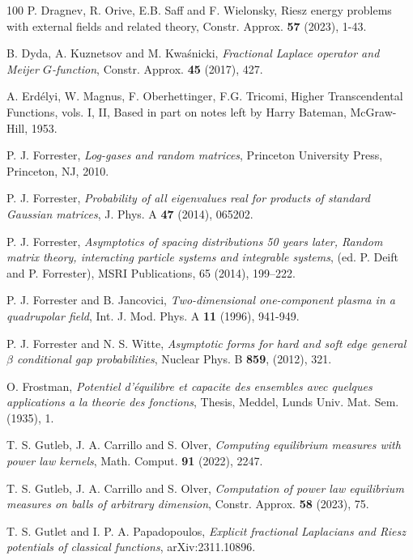\documentclass[10pt]{amsart}
\theoremstyle{plain}
\theoremstyle{remark}
\numberwithin{equation}{section}
\begin{document}
\begin{thebibliography}{100}
P. Dragnev, R. Orive, E.B. Saff and F. Wielonsky, Riesz energy problems with external fields and related theory, Constr. Approx. \textbf{57} (2023), 1-43.



 B. Dyda, A. Kuznetsov and M. Kwa\'{s}nicki, \emph{Fractional Laplace operator and Meijer $G$-function}, Constr. Approx. \textbf{45} (2017), 427. %




 A. Erdélyi, W. Magnus, F. Oberhettinger, F.G. Tricomi, Higher Transcendental Functions, vols. I, II, Based in part on notes left by Harry Bateman, McGraw-Hill, 1953. 
 

 P. J. Forrester, \emph{Log-gases and random matrices}, Princeton University Press, Princeton, NJ, 2010.

 P. J. Forrester, \emph{Probability of all eigenvalues real for products of standard Gaussian matrices}, J. Phys. A \textbf{47} (2014), 065202. 

 P. J. Forrester, \emph{Asymptotics of spacing distributions 50 years later, Random matrix theory, interacting particle systems and integrable systems}, (ed. P. Deift and P. Forrester), MSRI Publications, 65
(2014), 199–222.

 P. J. Forrester and B. Jancovici, \emph{Two-dimensional one-component plasma in a quadrupolar field}, Int. J. Mod. Phys. A \textbf{11} (1996), 941-949.



 P. J. Forrester and N. S. Witte, \emph{Asymptotic forms for hard and soft edge general $\beta$ conditional gap probabilities}, Nuclear Phys. B \textbf{859}, (2012), 321.%


 O. Frostman, \emph{Potentiel d'\'equilibre et capacite des ensembles avec quelques applications a la theorie des fonctions}, Thesis, Meddel, Lunds Univ. Mat. Sem.  (1935), 1.%
 

 T. S. Gutleb, J. A. Carrillo and S. Olver, \emph{Computing equilibrium measures with power law kernels}, Math. Comput. \textbf{91} (2022), 2247.%

 T. S. Gutleb, J. A. Carrillo and S. Olver, \emph{Computation of power law equilibrium measures on balls of arbitrary dimension}, Constr. Approx. \textbf{58} (2023), 75.%

 T. S. Gutlet and I. P. A. Papadopoulos, \emph{Explicit fractional Laplacians and Riesz potentials of classical functions}, arXiv:2311.10896. 


\end{thebibliography}
\end{document}
